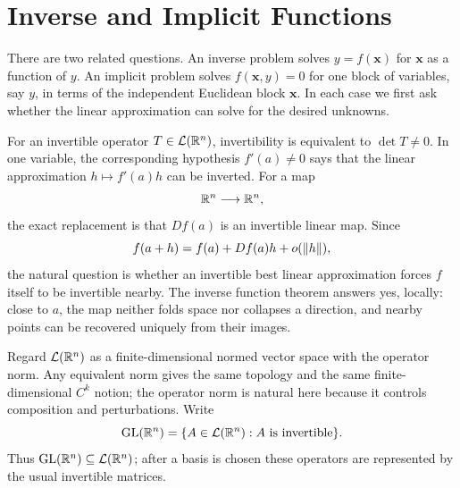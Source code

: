 \section{Inverse and Implicit Functions}

There are two related questions. An inverse problem solves $y=f(\mathbf{x})$ for
$\mathbf{x}$ as a function of $y$. An implicit problem solves
$f(\mathbf{x},y)=0$ for one block of variables, say $y$, in terms of
the independent Euclidean block $\mathbf{x}$.
In each case we first ask whether the linear approximation can solve
for the desired unknowns.


For an invertible operator $T\in\mathcal L(\mathbb{R}^n)$, invertibility is equivalent
to $\det T\ne0$.  In one variable, the corresponding hypothesis
\(f'(a)\ne0\) says that the linear approximation \(h\mapsto f'(a)h\) can
be inverted.  For a map
\[
\mathbb{R}^n\longrightarrow\mathbb{R}^n,
\]
the exact replacement is that \(Df(a)\) is an invertible linear map.  Since
\[
f(a+h)=f(a)+Df(a)h+o(\lVert h\rVert),
\]
the natural question is whether an invertible best linear approximation
forces $f$ itself to be invertible nearby.  The inverse function theorem
answers yes, locally: close to $a$, the map neither folds space nor collapses
a direction, and nearby points can be recovered uniquely from their images.

Regard $\mathcal L(\mathbb{R}^n)$ as a finite-dimensional normed vector space with
the operator norm. Any equivalent norm gives the same topology and the same
finite-dimensional $C^k$ notion; the operator norm is natural here because
it controls composition and perturbations. Write
\[
\operatorname{GL}(\mathbb{R}^n)
=\{A\in\mathcal L(\mathbb{R}^n):A\text{ is invertible}\}.
\]
Thus $\operatorname{GL}(\mathbb{R}^n)\subseteq\mathcal L(\mathbb{R}^n)$; after a basis is
chosen these operators are represented by the usual invertible matrices.

